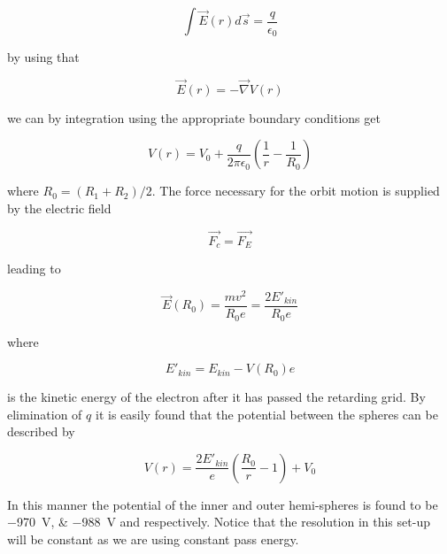 \begin{equation}
\int \vec{E}(r)d\vec{s}=\frac{q}{\epsilon_0}
\end{equation}

by using that

\begin{equation}
\vec{E}(r)=-\vec{\nabla}V(r)
\end{equation}

we can by integration using the appropriate boundary conditions get

\begin{equation}
V(r)=V_0 + \frac{q}{2\pi \epsilon_0}\left(\frac{1}{r}-\frac{1}{R_0}\right)
\end{equation}

where $R_0=\left(R_1+R_2\right)/2$. The force necessary for the orbit motion is supplied by the electric field

\begin{equation}
\vec{F_{c}}=\vec{F_{E}}
\end{equation}

leading to

\begin{equation}
\vec{E}(R_0)=\frac{mv^{2}}{R_0e}=\frac{2E'_{kin}}{R_0e}
\end{equation}

where

\begin{equation}
E'_{kin}=E_{kin}-V(R_0)e
\end{equation}

is the kinetic energy of the electron after it has passed the retarding grid. By elimination of $q$ it is easily found that the potential between the spheres can be described by

\begin{equation}
V(r)=\frac{2E'_{kin}}{e}\left(\frac{R_0}{r}-1\right)+V_0
\end{equation}

In this manner the potential of the inner and outer hemi-spheres is found to be \SIlist{-970;-988}{V} and respectively. Notice that the resolution in this set-up will be constant as we are using constant pass energy.
